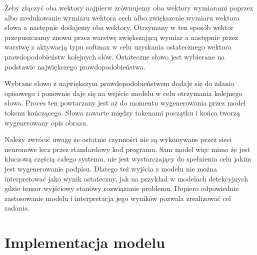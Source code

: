 
Żeby złączyć oba wektory najpierw zrównujemy oba wektory wymiarami poprzez albo zredukowanie wymiaru wektora cech albo zwiększenie wymiaru wektora słowa a następnie dodajemy oba wektory. Otrzymany w ten sposób wektor przepuszczamy znowu przez warstwę zwiększającą wymiar a następnie przez warstwę z aktywacją typu softmax w celu uzyskania ostatecznego wektora prawdopodobieństw kolejnych słów. Ostateczne słowo jest wybierane na podstawie największego prawdopodobieństwa.

Wybrane słowo z największym prawdopodobieństwem dodaje się do zdania opisowego i ponownie daje się na wejście modelu w celu otrzymania kolejnego słowa. Proces ten powtarzany jest aż do momentu wygenerowania przez model tokenu kończącego. Słowa zawarte między tokenami początku i końca tworzą wygenerowany opis obrazu.

Należy zwrócić uwagę że ostatnie czynności nie są wykonywane przez sieci neuronowe lecz przez standardowy kod programu. Sam model więc mimo że jest kluczową częścią całego systemu, nie jest wystarczający do spełnienia celu jakim jest wygenerowanie podpisu. Dlatego też wyjścia z modelu nie można interpretować jako wynik ostateczny, jak na przykład w modelach detekcyjnych gdzie tensor wyjściowy stanowy rozwiązanie problemu. Dopiero odpowiednie zastosowanie modelu i interpretacja jego wyników pozwala zrealizować cel zadania. 

\newpage

\section{Implementacja modelu}
